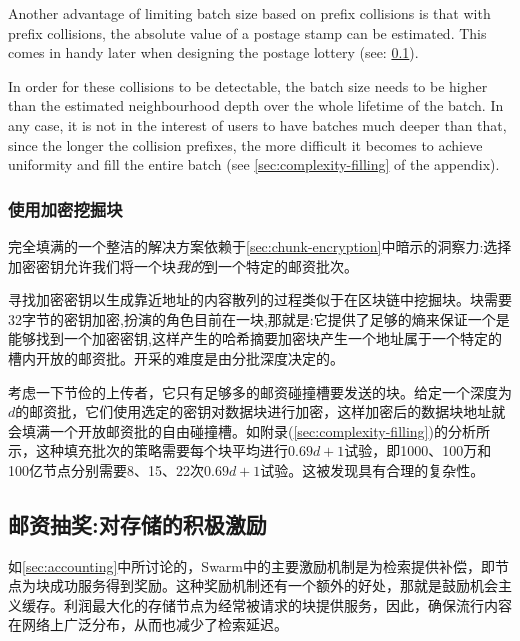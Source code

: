 Another advantage of limiting batch size based on prefix collisions is that with prefix collisions, the absolute value of a postage stamp can be estimated. This comes in handy later when designing the postage lottery (see: \ref{sec:postage-lottery}). 


In order for these collisions to be detectable, the batch size needs to be higher than the estimated neighbourhood depth over the whole lifetime of the batch. In any case, it is not in the interest of users to have batches much deeper than that, since the longer the collision prefixes, the more difficult it becomes to achieve uniformity and fill the entire batch  (see \ref{sec:complexity-filling} of the appendix). 


\subsubsection{使用加密挖掘块}

完全填满的一个整洁的解决方案依赖于\ref{sec:chunk-encryption}中暗示的洞察力:选择加密密钥允许我们将一个块\emph{我的}到一个特定的邮资批次。

寻找加密密钥以生成靠近地址的内容散列的过程类似于在区块链中挖掘块。块需要32字节的密钥加密,扮演的角色目前在一块,那就是:它提供了足够的熵来保证一个是能够找到一个加密密钥,这样产生的哈希摘要加密块产生一个地址属于一个特定的槽内开放的邮资批。开采的难度是由分批深度决定的。

考虑一下节俭的上传者，它只有足够多的邮资碰撞槽要发送的块。给定一个深度为$d$的邮资批，它们使用选定的密钥对数据块进行加密，这样加密后的数据块地址就会填满一个开放邮资批的自由碰撞槽。如附录(\ref{sec:complexity-filling})的分析所示，这种填充批次的策略需要每个块平均进行$0.69d+1$试验，即1000、100万和100亿节点分别需要8、15、22次$0.69d+1$试验。这被发现具有合理的复杂性。


\subsection{邮资抽奖:对存储的积极激励\statusyellow}\label{sec:postage-lottery}

\yellow{}

如\ref{sec:accounting}中所讨论的，Swarm中的主要激励机制是为检索提供补偿，即节点为块成功服务得到奖励。这种奖励机制还有一个额外的好处，那就是鼓励机会主义缓存。利润最大化的存储节点为经常被请求的块提供服务，因此，确保流行内容在网络上广泛分布，从而也减少了检索延迟。

